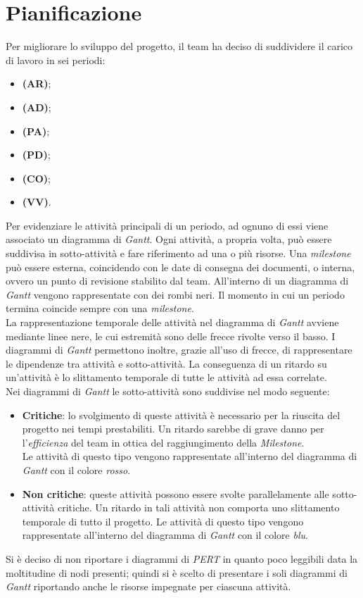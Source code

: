 \newpage
\section{Pianificazione}
Per migliorare lo sviluppo del progetto, il team ha deciso di suddividere il carico di lavoro in sei periodi:
\begin{itemize}
	\item \textbf{\AR (AR)};
	\item \textbf{\AD (AD)};
	\item \textbf{\PA (PA)};
	\item \textbf{\PD (PD)};
	\item \textbf{\CO (CO)};
	\item \textbf{\VV (VV)}.
\end{itemize}

Per evidenziare le attività principali di un periodo, ad ognuno di essi viene associato un diagramma di \textit{Gantt}. 
Ogni attività, a propria volta, può essere suddivisa in sotto-attività e fare riferimento ad una o più risorse.
Una \textit{milestone} può essere esterna, coincidendo con le date di consegna dei documenti, o interna, ovvero un punto di revisione stabilito dal team. 
All'interno di un diagramma di \textit{Gantt} vengono rappresentate con dei rombi neri. 
Il momento in cui un periodo termina coincide sempre con una \textit{milestone}.\\ 
La rappresentazione temporale delle attività nel diagramma di \textit{Gantt} avviene mediante linee nere, le cui estremità sono delle frecce rivolte verso il basso. 
I diagrammi di \textit{Gantt} permettono inoltre, grazie all'uso di frecce, di rappresentare le dipendenze tra attività e sotto-attività.
La conseguenza di un ritardo su un'attività è lo slittamento temporale di tutte le attività ad essa correlate. \\

Nei diagrammi di \textit{Gantt} le sotto-attività sono suddivise nel modo seguente:
\begin{itemize}
	\item \textbf{Critiche}: lo svolgimento di queste attività è necessario per la riuscita del progetto nei tempi prestabiliti. Un ritardo sarebbe di grave danno per l'\textit{efficienza} del team in ottica del raggiungimento della \textit{Milestone}. \\ 
	Le attività di questo tipo vengono rappresentate all'interno del diagramma di \textit{Gantt} con il colore \textit{rosso}.
	\item \textbf{Non critiche}: queste attività possono essere svolte parallelamente alle sotto-attività critiche. Un ritardo in tali attività non comporta uno slittamento temporale di tutto il progetto.
	Le attività di questo tipo vengono rappresentate all'interno del diagramma di \textit{Gantt} con il colore \textit{blu}.
\end{itemize}
Si è deciso di non riportare i diagrammi di \textit{PERT} in quanto poco leggibili data la moltitudine di nodi presenti; quindi si è scelto di presentare i soli diagrammi di \textit{Gantt} riportando anche le risorse impegnate per ciascuna attività.

